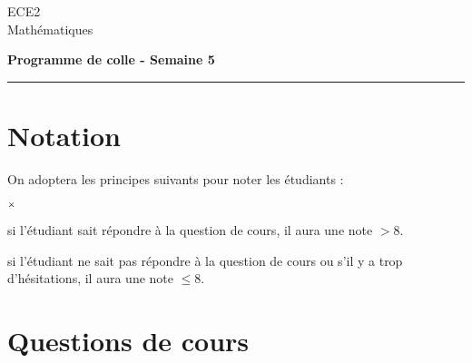 \documentclass[11pt]{article}%
\begin{document}
\begin{flushleft}
ECE2 \\
Mathématiques
\end{flushleft}


\vspace{0.1cm}

\begin{center}
\textbf{\Large{Programme de colle - Semaine 5}}
\end{center}

\hrule

\vspace*{0,2cm}

\section*{Notation}

On adoptera les principes suivants pour noter les étudiants :
\begin{noliste}{$\scriptstyle \times$}
\item si l'étudiant sait répondre à la question de cours, il 
aura une note $>8$.
\item si l'étudiant ne sait pas répondre à la question de 
cours ou s'il y a trop d'hésitations, il aura une note $\leq 8$.
\end{noliste}

\section*{Questions de cours}
\end{document}
